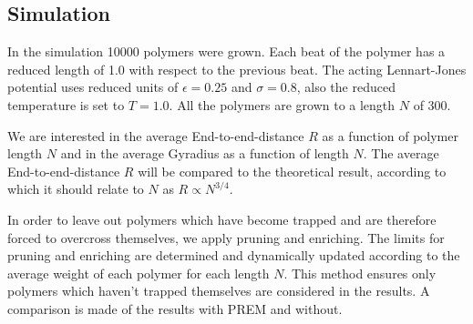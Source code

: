 \subsection*{Simulation}
In the simulation 10000 polymers were grown. Each beat of the polymer has a reduced length of 1.0 with respect to the previous beat. The acting Lennart-Jones potential uses reduced units of $\epsilon=0.25$ and $\sigma=0.8$, also the reduced temperature is set to $T=1.0$. All the polymers are grown to a length $N$ of 300. 

We are interested in the average End-to-end-distance $R$ as a function of polymer length $N$ and in the average Gyradius as a function of length $N$. The average End-to-end-distance $R$ will be compared to the theoretical result, according to which it should relate to $N$ as $R\propto N^{3/4}$.

In order to leave out polymers which have become trapped and are therefore forced to overcross themselves, we apply pruning and enriching. The limits for pruning and enriching are determined and dynamically updated according to the average weight of each polymer for each length $N$. This method ensures only polymers which haven't trapped themselves are considered in the results. A comparison is made of the results with PREM and without.